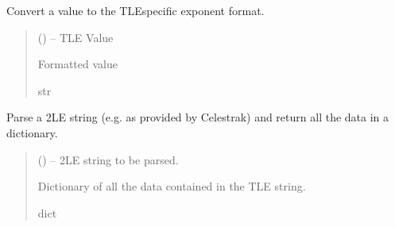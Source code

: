 \documentclass[letterpaper,10pt,english]{sphinxmanual}
\begin{document}

\begin{fulllineitems}
\label{\detokenize{fspsim.utils:fspsim.utils.Conversions.tle_exponent_format}}
\pysigstartsignatures
{}
\pysigstopsignatures
\sphinxAtStartPar
Convert a value to the TLE\sphinxhyphen{}specific exponent format.
\begin{quote}\begin{description}
\sphinxAtStartPar
{} () – TLE Value

\sphinxAtStartPar
Formatted value

\sphinxAtStartPar
str

\end{description}\end{quote}

\end{fulllineitems}


\begin{fulllineitems}
\label{\detokenize{fspsim.utils:fspsim.utils.Conversions.tle_parse}}
\pysigstartsignatures
{}
\pysigstopsignatures
\sphinxAtStartPar
Parse a 2LE string (e.g. as provided by Celestrak) and return all the data in a dictionary.
\begin{quote}\begin{description}
\sphinxAtStartPar
{} () – 2LE string to be parsed.

\sphinxAtStartPar
Dictionary of all the data contained in the TLE string.

\sphinxAtStartPar
dict

\end{description}\end{quote}

\end{fulllineitems}
\end{document}

